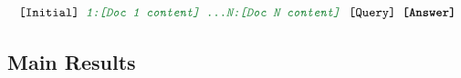 



{\small$${\texttt{[Initial]\textcolor{jacobcolor}{\textit{ 1:[Doc 1 content] \ldots N:[Doc N content]}} [Query] \textbf{[Answer]}}}$$}











\subsection{Main Results}

